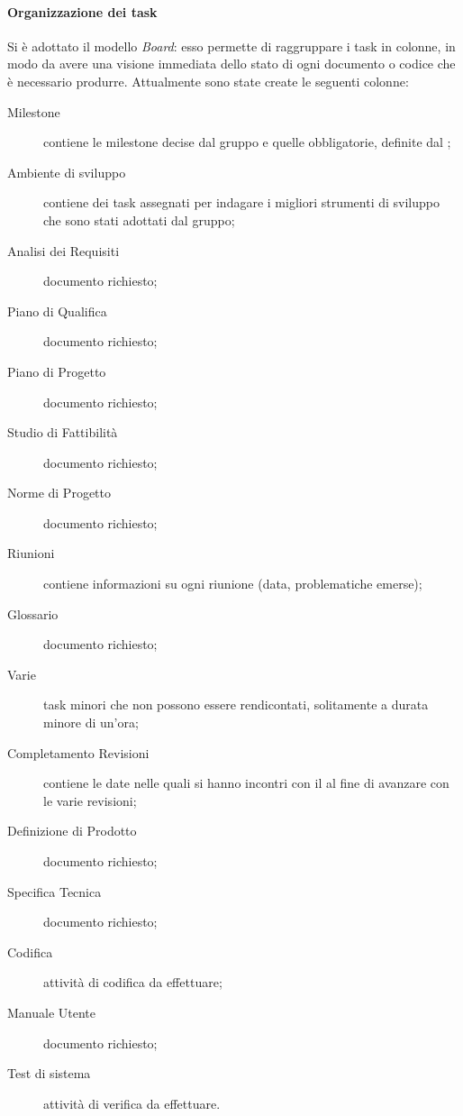 \paragraph{Organizzazione dei task} Si è adottato il modello \emph{Board}: esso permette di raggruppare i task in colonne, in modo da avere una visione immediata dello stato di ogni documento o codice che è necessario produrre.
Attualmente sono state create le seguenti colonne:
\begin{description}
	\item[Milestone] contiene le milestone decise dal gruppo e quelle obbligatorie, definite dal \TV;
	\item[Ambiente di sviluppo] contiene dei task assegnati per indagare i migliori strumenti di sviluppo che sono stati adottati dal gruppo;
	\item[Analisi dei Requisiti] documento richiesto;
	\item[Piano di Qualifica] documento richiesto;
	\item[Piano di Progetto] documento richiesto;
	\item[Studio di Fattibilità] documento richiesto;
	\item[Norme di Progetto] documento richiesto;
	\item[Riunioni] contiene informazioni su ogni riunione (data, problematiche emerse);
	\item[Glossario] documento richiesto;
	\item[Varie] task minori che non possono essere rendicontati, solitamente a durata minore di un'ora;
	\item[Completamento Revisioni] contiene le date nelle quali si hanno incontri con il \TV al fine di avanzare con le varie revisioni; 
	\item[Definizione di Prodotto] documento richiesto;
	\item[Specifica Tecnica] documento richiesto;
	\item[Codifica] attività di codifica da effettuare;
	\item[Manuale Utente] documento richiesto;
	\item[Test di sistema] attività di verifica da effettuare.
\end{description}
